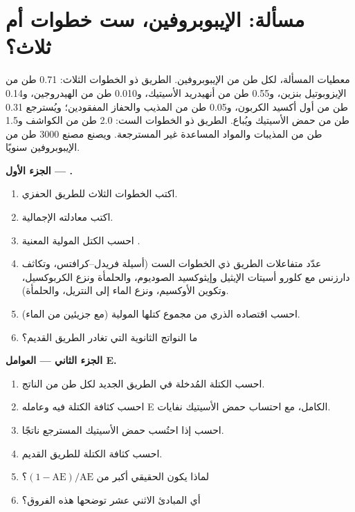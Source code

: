 \section{مسألة: الإيبوبروفين، ست خطوات أم ثلاث؟}

\begin{problem}
\label{pb:b3:green-industrial:1}
معطيات المسألة، لكل طن من الإيبوبروفين. الطريق ذو الخطوات الثلاث: 0.71 طن من
الإيزوبوتيل بنزين، و0.55 طن من أنهيدريد الأسيتيك، و0.010 طن من الهيدروجين، و0.14 طن من أول أكسيد
الكربون، و0.05 طن من المذيب والحفاز المفقودين؛ ويُسترجع 0.31 طن من حمض الأسيتيك
ويُباع. الطريق ذو الخطوات الست: 2.0 طن من الكواشف و1.5 طن من المذيبات والمواد
المساعدة غير المسترجعة. ويصنع مصنع 3000 طن من الإيبوبروفين سنويًا.

\medskip\noindent\textbf{الجزء الأول --- .}
\begin{enumerate}
  \item اكتب الخطوات الثلاث للطريق الحفزي.
  \item اكتب معادلته الإجمالية.
  \item احسب الكتل المولية المعنية .
  \item عدّد متفاعلات الطريق ذي الخطوات الست (أسيلة فريدل--كرافتس، وتكاثف
        دارزنس مع كلورو أسيتات الإيثيل وإيثوكسيد الصوديوم، والحلمأة
        ونزع الكربوكسيل، وتكوين الأوكسيم، ونزع الماء إلى النتريل، والحلمأة).
  \item احسب اقتصاده الذري من مجموع كتلها المولية (مع جزيئين من
        الماء).
  \item ما النواتج الثانوية التي تغادر الطريق القديم؟
\end{enumerate}

\medskip\noindent\textbf{الجزء الثاني --- العوامل E.}
\begin{enumerate}[resume]
  \item احسب الكتلة المُدخلة في الطريق الجديد لكل طن من الناتج.
  \item احسب كثافة الكتلة فيه وعامله E الكامل، مع احتساب حمض الأسيتيك نفايات.
  \item احسب  إذا احتُسب حمض الأسيتيك المسترجع ناتجًا.
  \item احسب كثافة الكتلة  للطريق القديم.
  \item لماذا يكون  الحقيقي أكبر من $(1 - \mathrm{AE})/\mathrm{AE}$؟
  \item أي المبادئ الاثني عشر توضحها هذه الفروق؟
\end{enumerate}


\end{problem}
